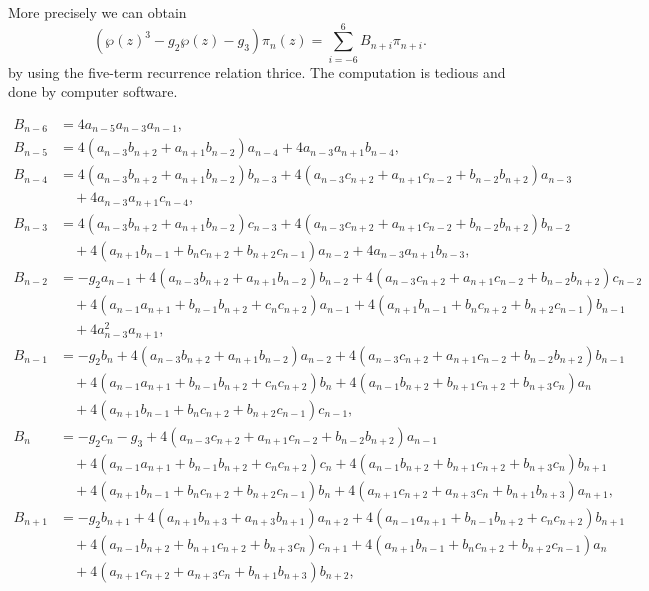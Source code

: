 \documentclass[11pt,a4paper]{article}
\theoremstyle{definition}
\numberwithin{equation}{section}
\numberwithin{theorem}{section}
\begin{document}
More precisely we can obtain 
\begin{equation}
   \left( \wp(z)^3-g_{2}\wp(z)-g_3\right)\pi_{n}(z)=\sum_{i=-6}^{6}B_{n+i}\pi_{n+i}.
\end{equation}
by using the five-term recurrence relation thrice. The computation is tedious and done by computer software. 

\begin{align*}
B_{n-6} &= 4 a_{n-5} a_{n-3} a_{n-1}, \\
B_{n-5} &= 4 (a_{n-3} b_{n+2} + a_{n+1} b_{n-2}) a_{n-4} + 4 a_{n-3} a_{n+1} b_{n-4}, \\
B_{n-4} &= 4 (a_{n-3} b_{n+2} + a_{n+1} b_{n-2}) b_{n-3} + 4 (a_{n-3} c_{n+2} + a_{n+1} c_{n-2} + b_{n-2} b_{n+2}) a_{n-3} \\&\quad + 4 a_{n-3} a_{n+1} c_{n-4}, \\
B_{n-3} &= 4 (a_{n-3} b_{n+2} + a_{n+1} b_{n-2}) c_{n-3} + 4 (a_{n-3} c_{n+2} + a_{n+1} c_{n-2} + b_{n-2} b_{n+2}) b_{n-2} \\&\quad + 4 (a_{n+1} b_{n-1} + b_n c_{n+2} + b_{n+2} c_{n-1}) a_{n-2} + 4 a_{n-3} a_{n+1} b_{n-3}, \\
B_{n-2} &= -g_2 a_{n-1} + 4 (a_{n-3} b_{n+2} + a_{n+1} b_{n-2}) b_{n-2} + 4 (a_{n-3} c_{n+2} + a_{n+1} c_{n-2} + b_{n-2} b_{n+2}) c_{n-2} \\&\quad + 4 (a_{n-1} a_{n+1} + b_{n-1} b_{n+2} + c_n c_{n+2}) a_{n-1} + 4 (a_{n+1} b_{n-1} + b_n c_{n+2} + b_{n+2} c_{n-1}) b_{n-1} \\&\quad + 4 a_{n-3}^2 a_{n+1}, \\
B_{n-1} &= -g_2 b_n + 4 (a_{n-3} b_{n+2} + a_{n+1} b_{n-2}) a_{n-2} + 4 (a_{n-3} c_{n+2} + a_{n+1} c_{n-2} + b_{n-2} b_{n+2}) b_{n-1} \\&\quad + 4 (a_{n-1} a_{n+1} + b_{n-1} b_{n+2} + c_n c_{n+2}) b_n + 4 (a_{n-1} b_{n+2} + b_{n+1} c_{n+2} + b_{n+3} c_n) a_n \\&\quad + 4 (a_{n+1} b_{n-1} + b_n c_{n+2} + b_{n+2} c_{n-1}) c_{n-1}, \\
B_n &= -g_2 c_n - g_3 + 4 (a_{n-3} c_{n+2} + a_{n+1} c_{n-2} + b_{n-2} b_{n+2}) a_{n-1} \\&\quad + 4 (a_{n-1} a_{n+1} + b_{n-1} b_{n+2} + c_n c_{n+2}) c_n + 4 (a_{n-1} b_{n+2} + b_{n+1} c_{n+2} + b_{n+3} c_n) b_{n+1} \\&\quad + 4 (a_{n+1} b_{n-1} + b_n c_{n+2} + b_{n+2} c_{n-1}) b_n + 4 (a_{n+1} c_{n+2} + a_{n+3} c_n + b_{n+1} b_{n+3}) a_{n+1}, \\
B_{n+1} &= -g_2 b_{n+1} + 4 (a_{n+1} b_{n+3} + a_{n+3} b_{n+1}) a_{n+2} + 4 (a_{n-1} a_{n+1} + b_{n-1} b_{n+2} + c_n c_{n+2}) b_{n+1} \\&\quad + 4 (a_{n-1} b_{n+2} + b_{n+1} c_{n+2} + b_{n+3} c_n) c_{n+1} + 4 (a_{n+1} b_{n-1} + b_n c_{n+2} + b_{n+2} c_{n-1}) a_n \\&\quad + 4 (a_{n+1} c_{n+2} + a_{n+3} c_n + b_{n+1} b_{n+3}) b_{n+2}, \\

\end{align*}
\end{document}

